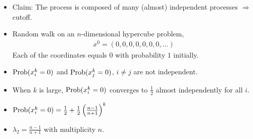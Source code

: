 \documentclass[12pt,t]{beamer}
\begin{document}
\begin{frame}
\begin{itemize}
   \item Claim: The process is composed of many (almost) independent processes $\Longrightarrow$ cutoff.
   \item Random walk on an $n$-dimensional hypercube problem,
         \begin{align*}
          x^0 = (0,0,0,0,0,0,0,...)
          \end{align*}
         Each of the coordinates equals $0$ with probability $1$ initially.
   \item $\operatorname{Prob}(x^k_i=0)$ and $\operatorname{Prob}(x^k_j=0)$, $i \neq j$ are not independent.
   \item When $k$ is large, $\operatorname{Prob}(x^k_i=0)$ converges to $\frac{1}{2}$ almost independently for all $i$.
   \item $\operatorname{Prob}(x^k_i=0) = \frac{1}{2}+\frac{1}{2}\left(\frac{n-1}{n+1}\right)^k $
   \item $\lambda_2 = \frac{n-1}{n+1}$ with multiplicity $n$.


\end{itemize}

\end{frame}
\end{document}
